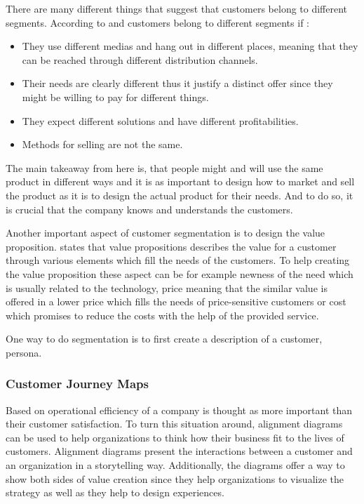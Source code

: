 There are many different things that suggest that customers belong to different segments. According to \textcite{LeanEntrepreneur:2013} and \textcite{BusinessModelGeneration:2010} customers belong to different segments if :
\begin{itemize}
\item They use different medias and hang out in different places, meaning that they can be reached through different distribution channels.
\item Their needs are clearly different thus it justify a distinct offer since they might be willing to pay for different things.
\item They expect different solutions and have different profitabilities.
\item Methods for selling are not the same.
\end{itemize}
The main takeaway from here is, that people might and will use the same product in different ways and it is as important to design how to market and sell the product as it is to design the actual product for their needs. And to do so, it is crucial that the company knows and understands the customers.

Another important aspect of customer segmentation is to design the value proposition. \textcite{BusinessModelGeneration:2010} states that value propositions describes the value for a customer through various elements which fill the needs of the customers. To help creating the value proposition these aspect can be for example newness of the need which is usually related to the technology, price meaning that the similar value is offered in a lower price which fills the needs of price-sensitive customers or cost which promises to reduce the costs with the help of the provided service.

One way to do segmentation is to first create a description of a customer, persona.

\subsubsection*{Customer Journey Maps}

Based on \textcite{Kalbach:2016} operational efficiency of a company is thought as more important than their customer satisfaction. To turn this situation around, alignment diagrams can be used to help organizations to think how their business fit to the lives of customers. Alignment diagrams present the interactions between a customer and an organization in a storytelling way. Additionally, the diagrams offer a way to show both sides of value creation since they help organizations to visualize the strategy as well as they help to design experiences. \parencite{Kalbach:2016}

